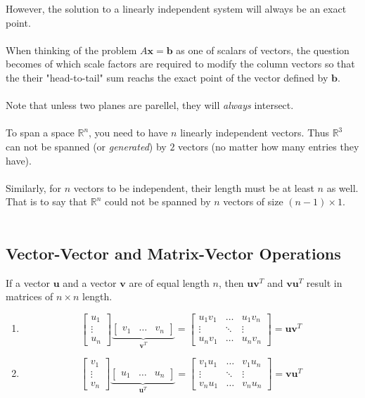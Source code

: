 \documentclass[12pt]{article}
\newcommand{\R}{\mathbb{R}}
\newcommand{\bm}[1]{\mathbf{{#1}}}
\newcommand{\mb}{\begin{bmatrix}}
\newcommand{\me}{\end{bmatrix}}
\begin{document}
However, the solution to a linearly independent system will always be an exact point. \\ \\

When thinking of the problem $A\bm{x} = \bm{b}$ as one of scalars of vectors, the question becomes of which scale factors
are required to modify the column vectors so that the their "head-to-tail" sum reachs the exact point of the vector defined by $\bm{b}$. \\ \\

Note that unless two planes are parellel, they will \emph{always} intersect. \\ \\

To span a space $\R^n$, you need to have $n$ linearly independent vectors. Thus $\R^3$ can not be spanned (or \emph{generated}) by $2$ vectors (no matter how many entries they have). \\ \\

Similarly, for $n$ vectors to be independent, their length must be at least $n$ as well. That is to say that $\R^n$ could not be spanned by $n$ vectors of size $(n - 1) \times 1$. \\ \\

\subsection*{Vector-Vector and Matrix-Vector Operations}

If a vector $\bm{u}$ and a vector $\bm{v}$ are of equal length $n$, then $\bm{u}\bm{v}^{T}$ and $\bm{v}\bm{u}^{T}$ result in matrices of $n \times n$ length.

\begin{enumerate}
\item $$\mb u_1 \\ \vdots \\ u_n \me \underbrace{\mb v_1 & \dots & v_n \me}_{\bm{v}^{T}} =
\mb
u_1 v_1 & \dots & u_1 v_n \\
\vdots & \ddots & \vdots \\
u_n v_1 & \dots & u_n v_n
\me = \bm{uv}^T$$

\item $$\mb v_1 \\ \vdots \\ v_n \me \underbrace{\mb u_1 & \dots & u_n \me}_{\bm{u}^{T}} =
\mb
v_1 u_1 & \dots & v_1 u_n \\
\vdots & \ddots & \vdots \\
v_n u_1 & \dots & v_n u_n
\me = \bm{vu}^T$$
\end{enumerate}
\end{document}
